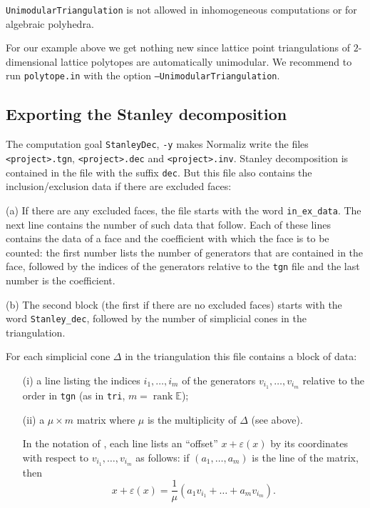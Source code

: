 \documentclass[12pt,a4paper]{scrartcl}
\newcounter{listi}
\theoremstyle{definition}
\def\EE{{\mathbb E}}
\DeclareMathOperator{\rank}{rank}
\let\epsilon=\varepsilon
\def\ttt{\texttt}
\begin{document}
{	\ttt{UnimodularTriangulation} is not allowed in inhomogeneous computations or for algebraic polyhedra.
	
	For our example above we get nothing new since lattice point triangulations of $2$-dimensional lattice polytopes are automatically unimodular. We recommend to run \ttt{polytope.in} with the option \ttt{--UnimodularTriangulation}.
	
	\subsection{Exporting the Stanley decomposition}\label{Stanley}
	
	The computation goal \ttt{StanleyDec}, \ttt{-y} makes Normaliz 
	write the files  \ttt{<project>.tgn}, \verb|<project>.dec| and \verb|<project>.inv|.   Stanley decomposition is contained in the file with the suffix \verb|dec|. But this file also contains the inclusion/exclusion data if there are excluded faces:
	
	(a) If there are any excluded faces, the file starts with the word
	\verb|in_ex_data|. The next line contains the number of such data that follow.
	Each of these lines contains the data of a face and the coefficient with which
	the face is to be counted: the first number lists the number of generators that
	are contained in the face, followed by the indices of the generators relative
	to the \verb|tgn| file and the last number is the coefficient.
	
	(b) The second block (the first if there are no excluded faces) starts with
	the word \verb|Stanley_dec|, followed by the number of simplicial cones in the
	triangulation.
	
	For each simplicial cone $\Delta$ in the
	triangulation this file contains a block of data:
	\begin{enumerate}
		\item[(i)] a line listing the indices $i_1,\dots,i_m$ of the
		generators $v_{i_1},\dots,v_{i_m}$ relative to the
		order in \ttt{tgn} (as in \ttt{tri}, $m=\rank \EE$);
		
		\item[(ii)] a $\mu\times m$ matrix where $\mu$ is the
		multiplicity of $\Delta$ (see above).
		
		In the notation of \cite{BIS}, each line lists an
		``offset'' $x+\epsilon(x)$  by its coordinates with
		respect to $v_{i_1},\dots,v_{i_m}$ as follows: if
		$(a_1,\dots,a_m)$ is the line of the matrix, then
		$$
		x+\epsilon(x)=\frac{1}{\mu}(a_1v_{i_1}+\dots+a_mv_{i_m}).
		$$
	\end{enumerate}
	
}
\end{document}
